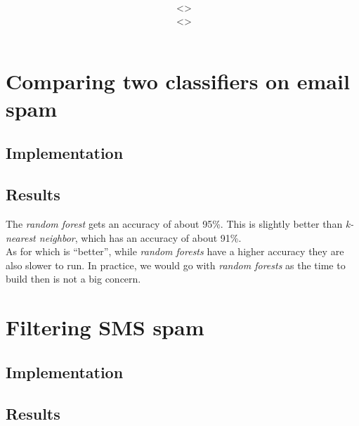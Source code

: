 \documentclass[12pt,a4paper]{article}
\title{\vspace{2in}\textmd{\hmwkClass\\\textbf{\hmwkTitle}}\\\normalsize\vspace{0.1in}\small{\hmwkDueDate}\\\vspace{4in}}
\date{}
\author{\textbf{\hmwkAuthorNameA} $\;$<\texttt{\href{mailto:laane2@illinois.edu}{\hmwkAuthorEmailA}}>\\\textbf{\hmwkAuthorNameB} $\;$<\texttt{\href{mailto:ruizcep2@illinois.edu}{\hmwkAuthorEmailB}}>}
\begin{document}
\begin{singlespace}

\begin{titlepage}
\maketitle
\thispagestyle{empty}
\end{titlepage}

\tableofcontents
\newpage


\clearpage

\section{Comparing two classifiers on email spam}
\subsection{Implementation}

\subsection{Results}

The \emph{random forest} gets an accuracy of about 95\%. This is slightly better than \emph{k-nearest neighbor}, which has an accuracy of about 91\%. \\

As for which is ``better'', while \emph{random forests} have a higher accuracy they are also slower to run. In practice, we would go with \emph{random forests} as the time to build then is not a big concern.


\newpage
\section{Filtering SMS spam}
\subsection{Implementation}

\subsection{Results}



\end{singlespace}
\end{document}
